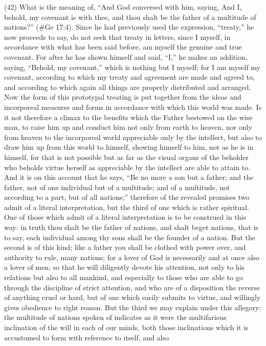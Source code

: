(42) What is the meaning of, ``And God conversed with him, saying, And I, behold, my covenant is
with thee, and thou shalt be the father of a multitude of nations?'' (\#Ge 17:4). Since he had
previously used the expression, ``treaty,'' he now proceeds to say, do not seek that treaty in letters,
since I myself, in accordance with what has been said before, am myself the genuine and true
covenant. For after he has shown himself and said, ``I,'' he makes an addition, saying, ``Behold, my
covenant,'' which is nothing but I myself; for I am myself my covenant, according to which my treaty
and agreement are made and agreed to, and according to which again all things are properly
distributed and arranged. Now the form of this prototypal treating is put together from the ideas and
incorporeal measures and forms in accordance with which this world was made. Is it not therefore
a climax to the benefits which the Father bestowed on the wise man, to raise him up and conduct
him not only from earth to heaven, nor only from heaven to the incorporeal world appreciable only
by the intellect, but also to draw him up from this world to himself, showing himself to him, not as he
is in himself, for that is not possible but as far as the visual organs of the beholder who beholds
virtue herself as appreciable by the intellect are able to attain to. And it is on this account that he
says, ``Be no more a son but a father; and the father, not of one individual but of a multitude; and of
a multitude, not according to a part, but of all nations;'' therefore of the revealed promises two
admit of a literal interpretation, but the third of one which is rather spiritual. One of those which
admit of a literal interpretation is to be construed in this way: in truth thou shalt be the father of
nations, and shalt beget nations, that is to say, each individual among thy sons shall be the founder
of a nation. But the second is of this kind; like a father you shall be clothed with power over, and
authority to rule, many nations; for a lover of God is necessarily and at once also a lover of men;
so that he will diligently devote his attention, not only to his relations but also to all mankind, and
especially to those who are able to go through the discipline of strict attention, and who are of a
disposition the reverse of anything cruel or hard, but of one which easily submits to virtue, and
willingly gives obedience to right reason. But the third we may explain under this allegory: the
multitude of nations spoken of indicates as it were the multifarious inclination of the will in each of
our minds, both those inclinations which it is accustomed to form with reference to itself, and also
